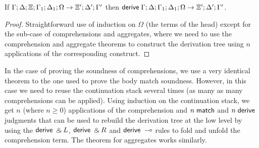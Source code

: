 \begin{lemma}[Derivation]
   If $\do \Gamma; \Delta; \Xi; \Gamma_1; \Delta_1; \Omega \rightarrow \Xi'; \Delta'; \Gamma'$ then $\mathsf{derive} \; \Gamma; \Delta; \Gamma_1; \Delta_1; \Omega \rightarrow \Xi'; \Delta'; \Gamma'$.
\end{lemma}
\begin{proof}
   Straightforward use of induction on $\Omega$ (the terms of the head) except for the sub-case of comprehensions and aggregates, where we need to use the comprehension and aggregate theorems to construct the derivation tree using $n$ applications of the corresponding construct.
\end{proof}

In the case of proving the soundness of comprehensions, we use a very identical theorem to the one used
to prove the body match soundness. However, in this case we need to reuse the continuation stack several
times (as many as many comprehensions can be applied). Using induction on the continuation stack, we get
$n$ (where $n \ge 0$) applications of the comprehension and $n \; \mathsf{match}$ and $n \; \mathsf{derive}$ judgments
that can be used to rebuild the derivation tree at the low level by using the $\mathsf{derive} \; \mathbin{\binampersand} L$, $\mathsf{derive} \; \mathbin{\binampersand} R$
and $\mathsf{derive} \; \multimap$ rules to fold and unfold the comprehension term. The theorem for aggregates works similarly.
